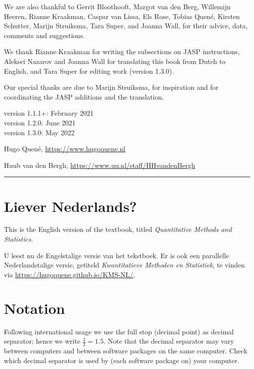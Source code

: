 \documentclass[
]{book}
\begin{document}
We are also thankful to
Gerrit Bloothooft,
Margot van den Berg,
Willemijn Heeren,
Rianne Kraakman,
Caspar van Lissa,
Els Rose,
Tobias Quené,
Kirsten Schutter,
Marijn Struiksma,
Tara Super,
and Joanna Wall,
for their advice, data, comments and suggestions.

We thank Rianne Kraakman for writing the subsections on JASP instructions, Aleksei Nazarov and Joanna Wall for translating this book from Dutch to English, and Tara Super for editing work (version 1.3.0).

Our special thanks are due to Marijn Struiksma, for inspiration and for coordinating the JASP additions and the translation.

version 1.1.1+: February 2021\\
version 1.2.0: June 2021\\
version 1.3.0: May 2022

Hugo Quené, \url{https://www.hugoquene.nl}

Huub van den Bergh, \url{https://www.uu.nl/staff/HHvandenBergh}

\begin{center}\rule{0.5\linewidth}{0.5pt}\end{center}

\hypertarget{liever-nederlands}{%
\section*{Liever Nederlands?}\label{liever-nederlands}}

This is the English version of the textbook, titled \emph{Quantitative Methods and Statistics}.

U leest nu de Engelstalige versie van het tekstboek. Er is ook een parallelle Nederlandstalige versie, getiteld \emph{Kwantitatieve Methoden en Statistiek}, te vinden via \url{https://hugoquene.github.io/KMS-NL/}.

\hypertarget{notation}{%
\section*{Notation}\label{notation}}

Following international usage we use the full stop (decimal point) as decimal separator; hence we write \(\frac{3}{2}=1.5\). Note that the decimal separator may vary between computers and between software packages on the same computer. Check which decimal separator is used by (each software package on) your computer.
\end{document}

